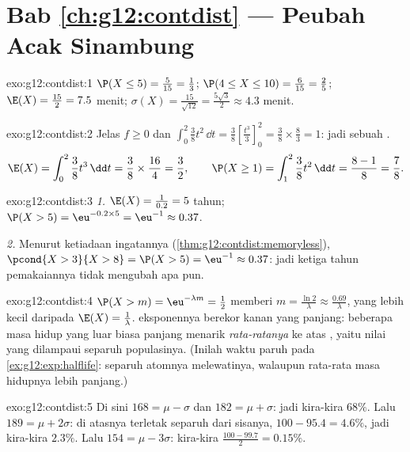 \section*{Bab \ref{ch:g12:contdist} --- Peubah Acak Sinambung}

\begin{solution}{exo:g12:contdist:1}
$\P(X \leq 5) = \frac{5}{15} = \frac13$;
$\P(4 \leq X \leq 10) = \frac{6}{15} = \frac25$;
$\E(X) = \frac{15}{2} = 7.5$ menit;
$\sigma(X) = \frac{15}{\sqrt{12}} = \frac{5\sqrt3}{2} \approx 4.3$ menit.
\end{solution}

\begin{solution}{exo:g12:contdist:2}
Jelas $f \geq 0$ dan
$\int_0^2 \frac38 t^2\,\dd t = \frac38\left[\frac{t^3}{3}\right]_0^2
= \frac38 \times \frac83 = 1$: jadi sebuah .
\[
\E(X) = \int_0^2 \frac38 t^3\,\dd t = \frac38 \times \frac{16}{4} = \frac32,
\qquad
\P(X \geq 1) = \int_1^2 \frac38 t^2\,\dd t = \frac{8 - 1}{8} = \frac78 .
\]
\end{solution}

\begin{solution}{exo:g12:contdist:3}
\emph{1.} $\E(X) = \frac{1}{0.2} = 5$ tahun;
$\P(X > 5) = \eu^{-0.2\times5} = \eu^{-1} \approx 0.37$.

\emph{2.} Menurut ketiadaan ingatannya (\cref{thm:g12:contdist:memoryless}),
$\pcond{X > 3}{X > 8} = \P(X > 5) = \eu^{-1} \approx 0.37$: jadi ketiga tahun
pemakaiannya tidak mengubah apa pun.
\end{solution}

\begin{solution}{exo:g12:contdist:4}
$\P(X > m) = \eu^{-\lambda m} = \frac12$ memberi
$m = \frac{\ln 2}{\lambda} \approx \frac{0.69}{\lambda}$, yang lebih kecil daripada
$\E(X) = \frac1\lambda$.  eksponennya berekor kanan yang panjang:
beberapa masa hidup yang luar biasa panjang menarik \emph{rata-ratanya} ke atas
\emph{}, yaitu nilai yang dilampaui separuh populasinya. (Inilah
waktu paruh pada \cref{ex:g12:exp:halflife}: separuh atomnya melewatinya, walaupun
rata-rata masa hidupnya lebih panjang.)
\end{solution}

\begin{solution}{exo:g12:contdist:5}
Di sini $168 = \mu - \sigma$ dan $182 = \mu + \sigma$: jadi kira-kira $68\%$.
Lalu $189 = \mu + 2\sigma$: di atasnya terletak separuh dari sisanya,
$100 - 95.4 = 4.6\%$, jadi kira-kira $2.3\%$.
Lalu $154 = \mu - 3\sigma$: kira-kira $\frac{100 - 99.7}{2} = 0.15\%$.
\end{solution}

